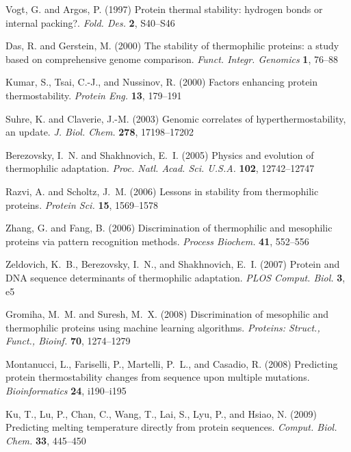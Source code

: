\documentclass[11pt,letter]{article}\usepackage[]{graphicx}\usepackage[]{color}
\begin{document}
\begin{thebibliography}{}
Vogt, G. and Argos, P. (1997) Protein thermal stability: hydrogen bonds or
  internal packing?. {\emph{Fold. Des.}} {\bf 2}, S40--S46

Das, R. and Gerstein, M. (2000) The stability of thermophilic proteins: a study
  based on comprehensive genome comparison. {\emph{Funct. Integr. Genomics}}
  {\bf 1}, 76--88

Kumar, S., Tsai, C.-J., and Nussinov, R. (2000) Factors enhancing protein
  thermostability. {\emph{Protein Eng.}} {\bf 13}, 179--191

Suhre, K. and Claverie, J.-M. (2003) Genomic correlates of
  hyperthermostability, an update. {\emph{J. Biol. Chem.}} {\bf 278},
  17198--17202

Berezovsky, I.~N. and Shakhnovich, E.~I. (2005) Physics and evolution of
  thermophilic adaptation. {\emph{Proc. Natl. Acad. Sci. U.S.A.}} {\bf 102},
  12742--12747

Razvi, A. and Scholtz, J.~M. (2006) Lessons in stability from thermophilic
  proteins. {\emph{Protein Sci.}} {\bf 15}, 1569--1578

Zhang, G. and Fang, B. (2006) Discrimination of thermophilic and mesophilic
  proteins via pattern recognition methods. {\emph{Process Biochem.}} {\bf 41},
  552--556

Zeldovich, K.~B., Berezovsky, I.~N., and Shakhnovich, E.~I. (2007) Protein and
  {DNA} sequence determinants of thermophilic adaptation. {\emph{PLOS Comput.
  Biol.}} {\bf 3}, e5

Gromiha, M.~M. and Suresh, M.~X. (2008) Discrimination of mesophilic and
  thermophilic proteins using machine learning algorithms. {\emph{Proteins:
  Struct., Funct., Bioinf.}} {\bf 70}, 1274--1279

Montanucci, L., Fariselli, P., Martelli, P.~L., and Casadio, R. (2008)
  Predicting protein thermostability changes from sequence upon multiple
  mutations. {\emph{Bioinformatics}} {\bf 24}, i190--i195

Ku, T., Lu, P., Chan, C., Wang, T., Lai, S., Lyu, P., and Hsiao, N. (2009)
  Predicting melting temperature directly from protein sequences.
  {\emph{Comput. Biol. Chem.}} {\bf 33}, 445--450


\end{thebibliography}
\end{document}
